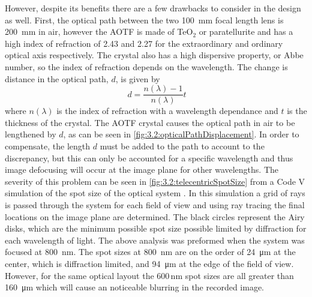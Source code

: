 
However, despite its benefits there are a few drawbacks to consider in the design as well. First, the optical path between the two 100~mm focal length lens is 200~mm in air, however the AOTF is made of TeO$_{2}$  or paratellurite and has a high index of refraction of 2.43 and 2.27 for the extraordinary and ordinary optical axis respectively. The crystal also has a high dispersive property, or Abbe number, so the index of refraction depends on the wavelength. The change is distance in the optical path, $d$, is given by
\begin{equation}
    \ d = \frac{n(\lambda)-1}{n(\lambda)}t
    \label{eqn:3.2:opticalPathDisplacement}
\end{equation}
where $n(\lambda)$ is the index of refraction with a wavelength dependance and $t$ is the thickness of the crystal. The AOTF crystal causes the optical path in air to be lengthened by $d$, as can be seen in \autoref{fig:3.2:opticalPathDisplacement}. In order to compensate, the length $d$ must be added to the path to account to the discrepancy, but this can only be accounted for a specific wavelength and thus image defocusing will occur at the image plane for other wavelengths. The severity of this problem can be seen in \autoref{fig:3.2:telecentricSpotSize} from a Code V simulation of the spot size of the optical system . In this simulation a grid of rays is passed through the system for each field of view and using ray tracing the final locations on the image plane are determined. The black circles represent the Airy disks, which are the minimum possible spot size possible limited by diffraction for each wavelength of light. The above analysis was preformed when the system was focused at 800~nm. The spot sizes at 800~nm are on the order of 24~\si{\micro\meter} at the center, which is diffraction limited, and 94~\si{\micro\meter} at the edge of the field of view. However, for the same optical layout the 600\,nm spot sizes are all greater than 160~\si{\micro\meter} which will cause an noticeable blurring in the recorded image.

